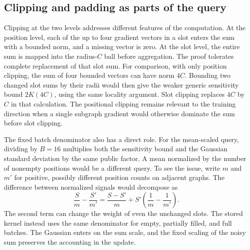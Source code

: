 \subsection{Clipping and padding as parts of the query}
Clipping at the two levels addresses different features of the computation. At the position level, each of the up to four gradient vectors in a slot enters the sum with a bounded norm, and a missing vector is zero. At the slot level, the entire sum is mapped into the radius-$C$ ball before aggregation. The proof tolerates complete replacement of that slot sum. For comparison, with only position clipping, the sum of four bounded vectors can have norm $4C$. Bounding two changed slot sums by their radii would then give the weaker generic sensitivity bound $2K(4C)$, using the same locality argument. Slot clipping replaces $4C$ by $C$ in that calculation. The positional clipping remains relevant to the training direction when a single subgraph gradient would otherwise dominate the sum before slot clipping.

The fixed batch denominator also has a direct role. For the mean-scaled query, dividing by $B=16$ multiplies both the sensitivity bound and the Gaussian standard deviation by the same public factor. A mean normalized by the number of nonempty positions would be a different query. To see the issue, write $m$ and $m'$ for positive, possibly different position counts on adjacent graphs. The difference between normalized signals would decompose as
\begin{equation}
 \frac{S}{m}-\frac{S'}{m'}
 =\frac{S-S'}{m}+
       S'\left(\frac{1}{m}-\frac{1}{m'}\right).
 \label{eq:variable-normalization}
\end{equation}
The second term can change the weight of even the unchanged slots. The stored kernel instead uses the same denominator for empty, partially filled, and full batches. The Gaussian enters on the sum scale, and the fixed scaling of the noisy sum preserves the accounting in the update.

